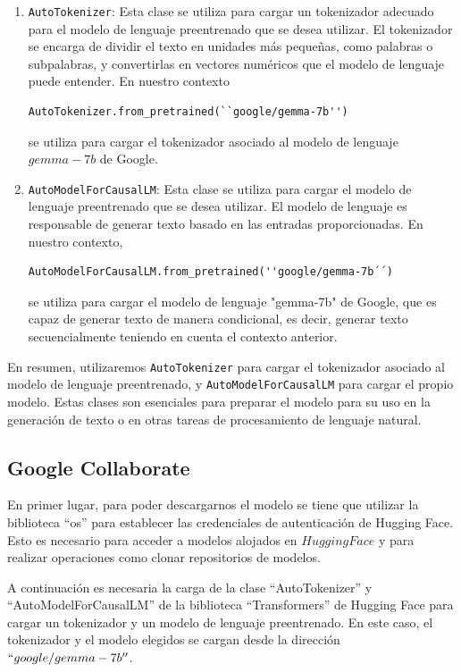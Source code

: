 \begin{enumerate}
	\item \texttt{AutoTokenizer}: Esta clase se utiliza para cargar un tokenizador adecuado para el modelo de lenguaje preentrenado que se desea utilizar. El tokenizador se encarga de dividir el texto en unidades más pequeñas, como palabras o subpalabras, y convertirlas en vectores numéricos que el modelo de lenguaje puede entender. En nuestro contexto 
	
\begin{verbatim}
AutoTokenizer.from_pretrained(``google/gemma-7b'')
\end{verbatim}

se utiliza para cargar el tokenizador asociado al modelo de lenguaje $gemma-7b$ de Google.
	
	\item \texttt{AutoModelForCausalLM}: Esta clase se utiliza para cargar el modelo de lenguaje preentrenado que se desea utilizar. El modelo de lenguaje es responsable de generar texto basado en las entradas proporcionadas. En nuestro contexto,
\begin{verbatim}
AutoModelForCausalLM.from_pretrained(''google/gemma-7b´´)
\end{verbatim}
	
se utiliza para cargar el modelo de lenguaje "gemma-7b" de Google, que es capaz de generar texto de manera condicional, es decir, generar texto secuencialmente teniendo en cuenta el contexto anterior.
\end{enumerate}

En resumen, utilizaremos \texttt{AutoTokenizer} para cargar el tokenizador asociado al modelo de lenguaje preentrenado, y \texttt{AutoModelForCausalLM} para cargar el propio modelo. Estas clases son esenciales para preparar el modelo para su uso en la generación de texto o en otras tareas de procesamiento de lenguaje natural.

\subsection{Google Collaborate}
En primer lugar, para poder descargarnos el modelo se tiene que utilizar la biblioteca ``os'' para establecer las credenciales de autenticación de Hugging Face. Esto es necesario para acceder a modelos alojados en $Hugging Face$ y para realizar operaciones como clonar repositorios de modelos.

A continuación es necesaria la carga de la clase ``AutoTokenizer'' y ``AutoModelForCausalLM'' de la biblioteca ``Transformers'' de Hugging Face para cargar un tokenizador y un modelo de lenguaje preentrenado. En este caso, el tokenizador y el modelo elegidos se cargan desde la dirección $``google/gemma-7b''$. 

